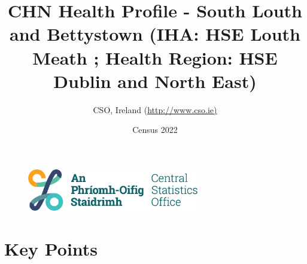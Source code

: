 \documentclass{article}
\title{CHN Health Profile - South Louth and Bettystown (IHA: HSE Louth Meath ;  Health Region: HSE Dublin and North East) }
\date{Census 2022}
\author{CSO, Ireland  (\url{http://www.cso.ie)}}
\begin{document}


\begin{figure}
	\centering
\includegraphics[width =75mm]{../figures/CSO_Logo.png}
\end{figure}

				 
		   
						  
														  
																																													
												 
			 
\maketitle
					
													   
				 
						 
																																																																											   
				 
				  
  \pagebreak
    	    \tableofcontents

\pagebreak


\section{Key Points}
\end{document}
